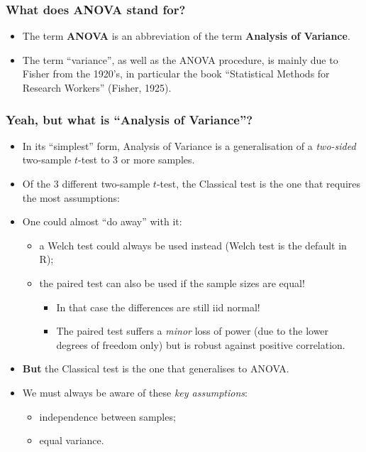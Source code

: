 \documentclass[a4paper]{article}
\begin{document}
\subsubsection{What does ANOVA stand for?}
\begin{itemize}
	\item The term \textbf{ANOVA} is an abbreviation of the term \textbf{Analysis of Variance}.
	\item The term ``variance'', as well as the ANOVA procedure, is mainly due to Fisher from the 1920's, in particular the book ``Statistical Methods for Research Workers'' (Fisher, 1925).
\end{itemize}
\subsubsection{Yeah, but what is ``Analysis of Variance''?}
\begin{itemize}
	\item In its ``simplest'' form, Analysis of Variance is a generalisation of a \textit{two-sided} two-sample \( t \)-test to 3 or more samples.
	\item Of the 3 different two-sample \( t \)-test, the Classical test is the one that requires the most assumptions:
	\item One could almost ``do away'' with it:
	\begin{itemize}
		\item a Welch test could always be used instead (Welch test is the default in R);
		\item the paired test can also be used if the sample sizes are equal!
		\begin{itemize}
			\item In that case the differences are still iid normal!
			\item The paired test suffers a \textit{minor} loss of power (due to the lower degrees of freedom only) but is robust against positive correlation.
		\end{itemize}
	\end{itemize}
	\item \textbf{But} the Classical test is the one that generalises to ANOVA.
	\item We must always be aware of these \textit{key assumptions}:
	\begin{itemize}
		\item independence between samples;
		\item equal variance.
	\end{itemize}
\end{itemize}
\end{document}
